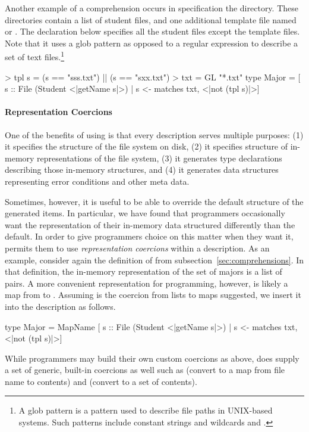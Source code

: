 Another example of a comprehension occurs in specification the  
directory.  These directories contain a list of student files, and one additional
template file named  or .  The declaration below
specifies all the student files except the template files.  Note that it uses
a glob pattern as opposed to a regular expression
to describe a set of text files.\footnote{A glob pattern
is a pattern used to describe file paths in UNIX-based systems.  Such patterns include
constant strings and wildcards \cd{*} and .} 
\begin{code}
> tpl s = (s == "sss.txt") || (s == "sxx.txt")
> txt = GL "*.txt"
\mbox{}
type Major =   
  [ s :: File (Student <|getName s|>) 
  | s <- matches txt, <|not (tpl s)|>]
\end{code}

\paragraph*{Representation Coercions}
One of the benefits of using \forest{} is that every description serves multiple purposes:
(1) it specifies the structure of the file system on disk, (2) it specifies structure of in-memory
representations of the file system, (3) it generates type declarations describing those in-memory
structures, and (4) it generates data structures representing error conditions and other meta data.

Sometimes, however, it is useful to be able to override the default structure of the generated items.
In particular, we have found that programmers occasionally want the representation of their in-memory data
structured differently than the default.  In order to give programmers choice on this matter when they want it,
\forest{} permits them to use {\em representation coercions} within a description.  As an example, consider
again the definition of  from subsection~\ref{sec:comprehensions}.  In that definition, the
in-memory representation of the set of majors is a list of  pairs.  A more convenient
representation for programming, however, is likely a map from  to .  Assuming
 is the coercion from lists to maps suggested, 
we insert it into the description as follows.
\begin{code}
type Major = 
  MapName [ s :: File (Student <|getName s|>) 
          | s <- matches txt, <|not (tpl s)|>]
\end{code}
While programmers may build their own custom coercions as above, \forest{} does supply a set of 
generic, built-in coercions as well such as  (convert to a map from file name to contents)
and  (convert to a set of contents).


